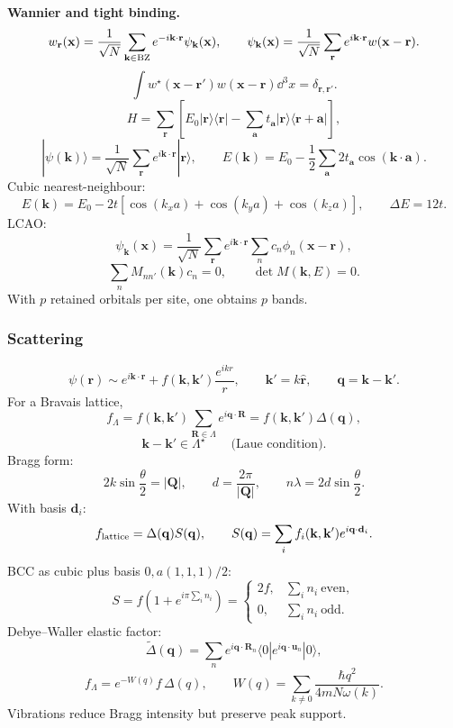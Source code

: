 \noindent\textbf{Wannier and tight binding.}
\[
w_{\mathbf r}(\mathbf x)=\frac1{\sqrt N}\sum_{\mathbf k\in{\rm BZ}}
e^{-i\mathbf k\cdot\mathbf r}\psi_{\mathbf k}(\mathbf x),\qquad
\psi_{\mathbf k}(\mathbf x)=\frac1{\sqrt N}\sum_{\mathbf r}
e^{i\mathbf k\cdot\mathbf r}w(\mathbf x-\mathbf r).
\]
\[
\int w^\star(\mathbf x-\mathbf r')w(\mathbf x-\mathbf r)\dd^3x=\delta_{\mathbf r,\mathbf r'}.
\]
\[
H=\sum_{\mathbf r}\left[E_0|\mathbf r\rangle\langle\mathbf r|
-\sum_{\mathbf a}t_{\mathbf a}|\mathbf r\rangle\langle\mathbf r+\mathbf a|\right],
\]
\[
|\psi(\mathbf k)\rangle=\frac1{\sqrt N}\sum_{\mathbf r}e^{i\mathbf k\cdot\mathbf r}|\mathbf r\rangle,\qquad
E(\mathbf k)=E_0-\frac12\sum_{\mathbf a}2t_{\mathbf a}\cos(\mathbf k\cdot\mathbf a).
\]
Cubic nearest-neighbour:
\[
\boxed{E(\mathbf k)=E_0-2t[\cos(k_xa)+\cos(k_ya)+\cos(k_za)]},\qquad
\Delta E=12t.
\]
LCAO:
\[
\psi_{\mathbf k}(\mathbf x)=\frac1{\sqrt N}\sum_{\mathbf r}e^{i\mathbf k\cdot\mathbf r}
\sum_n c_n\phi_n(\mathbf x-\mathbf r),
\]
\[
\sum_n M_{nn'}(\mathbf k)c_n=0,\qquad
\boxed{\det M(\mathbf k,E)=0}.
\]
With $p$ retained orbitals per site, one obtains $p$ bands. 

\subsubsection*{Scattering}

\[
\psi(\mathbf r)\sim e^{i\mathbf k\cdot\mathbf r}
+f(\mathbf k,\mathbf k')\frac{e^{ikr}}{r},\qquad
\mathbf k'=k\hat{\mathbf r},\qquad \mathbf q=\mathbf k-\mathbf k'.
\]
For a Bravais lattice,
\[
f_\Lambda=f(\mathbf k,\mathbf k')\sum_{\mathbf R\in\Lambda}e^{i\mathbf q\cdot\mathbf R}
=f(\mathbf k,\mathbf k')\Delta(\mathbf q),
\]
\[
\boxed{\mathbf k-\mathbf k'\in\Lambda^\star}\qquad\text{(Laue condition)}.
\]
Bragg form:
\[
2k\sin\frac{\theta}{2}=|\mathbf Q|,\qquad d=\frac{2\pi}{|\mathbf Q|},\qquad
\boxed{n\lambda=2d\sin\frac{\theta}{2}}.
\]
With basis $\mathbf d_i$:
\[
f_{\rm lattice}=\Delta(\mathbf q)S(\mathbf q),\qquad
S(\mathbf q)=\sum_if_i(\mathbf k,\mathbf k')e^{i\mathbf q\cdot\mathbf d_i}.
\]
BCC as cubic plus basis $0,a(1,1,1)/2$:
\[
S=f\left(1+e^{i\pi\sum_i n_i}\right)
=\begin{cases}2f,&\sum_i n_i\ \text{even},\\
0,&\sum_i n_i\ \text{odd}.
\end{cases}
\]
Debye--Waller elastic factor:
\[
\widetilde\Delta(\mathbf q)=
\sum_ne^{i\mathbf q\cdot\mathbf R_n}\langle0|e^{i\mathbf q\cdot\mathbf u_n}|0\rangle,
\]
\[
\boxed{f_\Lambda=e^{-W(q)}f\,\Delta(q)},\qquad
W(q)=\sum_{k\ne0}\frac{\hbar q^2}{4mN\omega(k)}.
\]
Vibrations reduce Bragg intensity but preserve peak support. 


